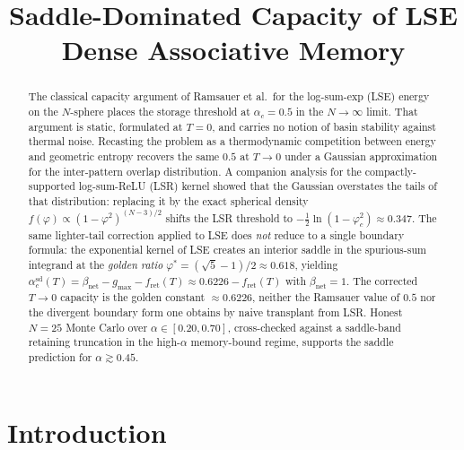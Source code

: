 \documentclass[11pt]{article}
\title{\bfseries Saddle-Dominated Capacity of LSE Dense Associative Memory}
\author{}
\date{}
\newcommand{\Bnet}{\beta_{\mathrm{net}}}
\newcommand{\fret}{f_{\mathrm{ret}}}
\newcommand{\acSd}{\alpha_c^{\mathrm{sd}}}
\begin{document}
\maketitle

\begin{abstract}
\noindent
The classical capacity argument of Ramsauer et al.\ for the log-sum-exp (LSE)
energy on the $N$-sphere places the storage threshold at $\alpha_c = 0.5$ in
the $N\!\to\!\infty$ limit. That argument is static, formulated at $T=0$, and
carries no notion of basin stability against thermal noise. Recasting the
problem as a thermodynamic competition between energy and geometric entropy
recovers the same $0.5$ at $T\!\to\!0$ under a Gaussian approximation for the
inter-pattern overlap distribution. A companion analysis for the
compactly-supported log-sum-ReLU (LSR) kernel showed that the Gaussian
overstates the tails of that distribution: replacing it by the exact
spherical density $f(\varphi)\propto(1-\varphi^2)^{(N-3)/2}$ shifts the LSR
threshold to $-\tfrac12\ln(1-\varphi_c^2)\approx0.347$. The same lighter-tail
correction applied to LSE does \emph{not} reduce to a single boundary
formula: the exponential kernel of LSE creates an interior saddle in the
spurious-sum integrand at the \emph{golden ratio}
$\varphi^{*} = (\sqrt{5}-1)/2 \approx 0.618$, yielding
$\acSd(T) = \Bnet - g_{\max} - \fret(T) \approx 0.6226 - \fret(T)$ with
$\Bnet = 1$. The corrected $T\!\to\!0$ capacity is the golden constant
$\approx 0.6226$, neither the Ramsauer value of $0.5$ nor the divergent
boundary form one obtains by naive transplant from LSR. Honest $N=25$ Monte
Carlo over $\alpha\in[0.20,0.70]$, cross-checked against a saddle-band
retaining truncation in the high-$\alpha$ memory-bound regime, supports the
saddle prediction for $\alpha\gtrsim0.45$.
\end{abstract}

\section{Introduction}
\label{sec:intro}
\end{document}
